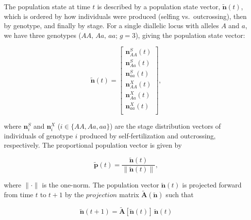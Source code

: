 \documentclass[11pt]{article}
\def\mbf#1{\mathbf{#1}}
\begin{document}

The population state at time $t$ is described by a population state vector, $\tilde{\mbf{n}}(t)$, which is ordered by how individuals were produced (selfing vs.~outcrossing), then by genotype, and finally by stage. For a single diallelic locus with alleles $A$ and $a$, we have three genotypes ($AA,\, Aa,\, aa$; $g = 3$), giving the population state vector:
\begin{linenomath*}
\begin{equation} \label{eq:PopStateVec}
	\tilde{\mbf{n}}(t) =  \left[
								\begin{array}{c}
									\mbf{n}^{S}_{AA}(t) \\
									\mbf{n}^{S}_{Aa}(t) \\
									\mbf{n}^{S}_{aa}(t) \\ \hline
									\mbf{n}^{X}_{AA}(t) \\
									\mbf{n}^{X}_{Aa}(t) \\
									\mbf{n}^{X}_{aa}(t) \\ 
						\end{array} \right],
\end{equation}
\end{linenomath*}

\noindent where $\mbf{n}^{S}_{i}$ and $\mbf{n}^{X}_{i}$ ($i \in \{AA,Aa,aa\}$) are the stage distribution vectors of individuals of genotype $i$ produced by self-fertilization and outcrossing, respectively. The proportional population vector is given by
\begin{linenomath*}
\begin{equation} \label{eq:propPopVec}
	\tilde{\mbf{p}}(t) = \frac{\tilde{\mbf{n}}(t)}{ \| \tilde{\mbf{n}}(t) \|},
\end{equation}
\end{linenomath*}

\noindent where $\| \cdot \|$ is the one-norm. The population vector $\tilde{\mbf{n}}(t)$ is projected forward from time $t$ to $t + 1$ by the $projection$ matrix $\tilde{\mbf{A}}(\tilde{\mbf{n}})$ such that 
\begin{linenomath*}
\begin{equation}
	\tilde{\mbf{n}}(t + 1) = \tilde{\mbf{A}}[\tilde{\mbf{n}}(t)] \, \tilde{\mbf{n}}(t)
\end{equation}
\end{linenomath*}
\end{document}
